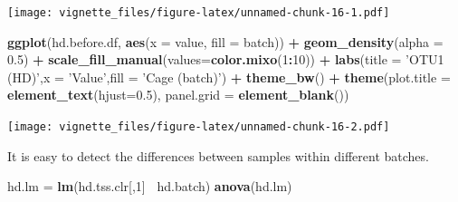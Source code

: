 \documentclass[]{book}
\newenvironment{Shaded}{\begin{snugshade}}{\end{snugshade}}
\newcommand{\KeywordTok}[1]{\textcolor[rgb]{0.13,0.29,0.53}{\textbf{#1}}}
\newcommand{\DataTypeTok}[1]{\textcolor[rgb]{0.13,0.29,0.53}{#1}}
\newcommand{\DecValTok}[1]{\textcolor[rgb]{0.00,0.00,0.81}{#1}}
\newcommand{\FloatTok}[1]{\textcolor[rgb]{0.00,0.00,0.81}{#1}}
\newcommand{\StringTok}[1]{\textcolor[rgb]{0.31,0.60,0.02}{#1}}
\newcommand{\CommentTok}[1]{\textcolor[rgb]{0.56,0.35,0.01}{\textit{#1}}}
\newcommand{\OperatorTok}[1]{\textcolor[rgb]{0.81,0.36,0.00}{\textbf{#1}}}
\newcommand{\NormalTok}[1]{#1}
\begin{document}
\begin{Shaded}
\end{Shaded}

\texttt{[image: vignette\_files/figure-latex/unnamed-chunk-16-1.pdf]}

\begin{Shaded}
\begin{Highlighting}[]
\KeywordTok{ggplot}\NormalTok{(hd.before.df, }\KeywordTok{aes}\NormalTok{(}\DataTypeTok{x =}\NormalTok{ value, }\DataTypeTok{fill =}\NormalTok{ batch)) }\OperatorTok{+}\StringTok{ }\KeywordTok{geom_density}\NormalTok{(}\DataTypeTok{alpha =} \FloatTok{0.5}\NormalTok{) }\OperatorTok{+}\StringTok{ }\KeywordTok{scale_fill_manual}\NormalTok{(}\DataTypeTok{values=}\KeywordTok{color.mixo}\NormalTok{(}\DecValTok{1}\OperatorTok{:}\DecValTok{10}\NormalTok{)) }\OperatorTok{+}\StringTok{ }\KeywordTok{labs}\NormalTok{(}\DataTypeTok{title =} \StringTok{'OTU1 (HD)'}\NormalTok{,}\DataTypeTok{x =} \StringTok{'Value'}\NormalTok{,}\DataTypeTok{fill =} \StringTok{'Cage (batch)'}\NormalTok{) }\OperatorTok{+}\StringTok{ }\KeywordTok{theme_bw}\NormalTok{() }\OperatorTok{+}\StringTok{ }\KeywordTok{theme}\NormalTok{(}\DataTypeTok{plot.title =} \KeywordTok{element_text}\NormalTok{(}\DataTypeTok{hjust=}\FloatTok{0.5}\NormalTok{), }\DataTypeTok{panel.grid =} \KeywordTok{element_blank}\NormalTok{())}
\end{Highlighting}
\end{Shaded}

\texttt{[image: vignette\_files/figure-latex/unnamed-chunk-16-2.pdf]}

It is easy to detect the differences between samples within different
batches.

\begin{Shaded}
\begin{Highlighting}[]
\NormalTok{hd.lm =}\StringTok{ }\KeywordTok{lm}\NormalTok{(hd.tss.clr[,}\DecValTok{1}\NormalTok{]}\OperatorTok{~}\StringTok{ }\NormalTok{hd.batch)}
\KeywordTok{anova}\NormalTok{(hd.lm)}
\end{Highlighting}
\end{Shaded}
\end{document}
